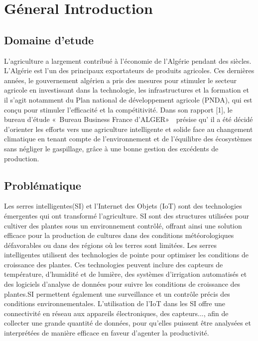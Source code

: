 \chapter*{Géneral Introduction} 
\label{chap:introduction} 


\section*{Domaine d'etude}

L’agriculture a largement contribué à l’économie de l’Algérie pendant des siècles. L’Algérie
est l’un des principaux exportateurs de produits agricoles. Ces dernières années, le
gouvernement algérien a pris des mesures pour stimuler le secteur agricole en investissant
dans la technologie, les infrastructures et la formation et il s’agit notamment du Plan
national de développement agricole (PNDA), qui est conçu pour stimuler l’efficacité et
la compétitivité. Dans son rapport [1], le bureau d’étude « Bureau Business France d’ALGER»  présise qu’ il a été décidé d’orienter les efforts vers une agriculture intelligente et solide face au changement climatique en tenant compte de l’environnement et de l’équilibre des écosystèmes sans négliger le gaspillage, grâce à une bonne gestion des excédents de production.


\section*{Problématique }
Les serres intelligentes(SI) et l’Internet des Objets (IoT) sont des technologies émergentes
qui ont transformé l’agriculture. SI sont des structures utilisées pour cultiver des plantes
sous un environnement contrôlé, offrant ainsi une solution efficace pour la production
de cultures dans des conditions météorologiques défavorables ou dans des régions où les
terres sont limitées.
Les serres intelligentes utilisent des technologies de pointe pour optimiser les conditions
de croissance des plantes. Ces technologies peuvent inclure des capteurs de température,
d’humidité et de lumière, des systèmes d’irrigation automatisés et des logiciels d’analyse
de données pour suivre les conditions de croissance des plantes.SI permettent également
une surveillance et un contrôle précis des conditions environnementales.
L’utilisation de l’IoT dans les SI offre une connectivité en réseau aux appareils électroniques, des capteurs..., afin de collecter une grande quantité de données, pour qu’elles puissent être analysées et interprétées de manière efficace en faveur d’agenter la productivité.


